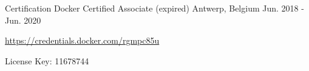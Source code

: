 \begin{cventries}
  \cventry
    {Certification} %
    {Docker Certified Associate (expired)} %
    {Antwerp, Belgium} %
    {Jun. 2018 - Jun. 2020} %
    {
      \begin{cvitems} %
        \item \url{https://credentials.docker.com/rgmpc85u}
        \item {License Key: 11678744}
      \end{cvitems}
    }


\end{cventries}
